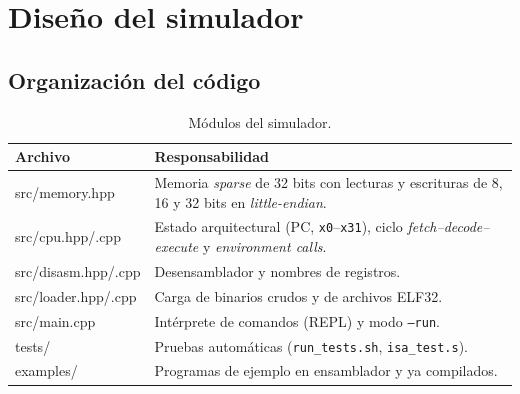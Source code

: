 \documentclass[11pt,a4paper]{article}
\begin{document}
\section{Diseño del simulador}

\subsection{Organización del código}

\begin{table}[h]
  \centering
  \caption{Módulos del simulador.}
  \begin{tabularx}{\textwidth}{>{\ttfamily}l X}
    \toprule
    \textbf{Archivo} & \textbf{Responsabilidad} \\
    \midrule
    src/memory.hpp & Memoria \textit{sparse} de 32 bits con lecturas y escrituras de
      8, 16 y 32 bits en \textit{little-endian}. \\
    src/cpu.hpp/.cpp & Estado arquitectural (PC, \texttt{x0}--\texttt{x31}), ciclo
      \textit{fetch--decode--execute} y \textit{environment calls}. \\
    src/disasm.hpp/.cpp & Desensamblador y nombres de registros. \\
    src/loader.hpp/.cpp & Carga de binarios crudos y de archivos ELF32. \\
    src/main.cpp & Intérprete de comandos (REPL) y modo \texttt{--run}. \\
    tests/ & Pruebas automáticas (\texttt{run\_tests.sh}, \texttt{isa\_test.s}). \\
    examples/ & Programas de ejemplo en ensamblador y ya compilados. \\
    \bottomrule
  \end{tabularx}
\end{table}
\end{document}

